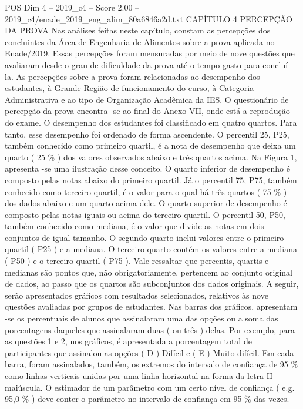 \begin{textsample}{POS Dim 4 – 2019\_c4 – Score 2.00 – 2019\_c4/enade\_2019\_eng\_alim\_80a6846a2d.txt}  \label{ex:f4_pos_112}
CAPÍTULO 4 PERCEPÇÃO DA PROVA Nas análises feitas neste capítulo, constam as percepções dos concluintes da Área de Engenharia de Alimentos sobre a prova aplicada no Enade/2019.
Essas percepções foram mensuradas por meio de nove questões que avaliaram desde o grau de dificuldade da prova até o tempo gasto para concluí -la.
As percepções sobre a prova foram relacionadas ao desempenho dos estudantes, à Grande Região de funcionamento do curso, à Categoria Administrativa e ao tipo de Organização Acadêmica da IES.
O questionário de percepção da prova encontra -se ao final do Anexo VII, onde está a reprodução do exame.
O desempenho dos estudantes foi classificado em quatro quartos.
Para tanto, esse desempenho foi ordenado de forma ascendente.
O percentil 25, P25, também conhecido como primeiro quartil, é a nota de desempenho que deixa um quarto ( 25 \% ) dos valores observados abaixo e três quartos acima.
Na Figura 1, apresenta -se uma ilustração desse conceito.
O quarto inferior de desempenho é composto pelas notas abaixo do primeiro quartil.
Já o percentil 75, P75, também conhecido como terceiro quartil, é o valor para o qual há três quartos ( 75 \% ) dos dados abaixo e um quarto acima dele.
O quarto superior de desempenho é composto pelas notas iguais ou acima do terceiro quartil.
O percentil 50, P50, também conhecido como mediana, é o valor que divide as notas em dois conjuntos de igual tamanho.
O segundo quarto inclui valores entre o primeiro quartil ( P25 ) e a mediana.
O terceiro quarto contém os valores entre a mediana ( P50 ) e o terceiro quartil ( P75 ).
Vale ressaltar que percentis, quartis e medianas são pontos que, não obrigatoriamente, pertencem ao conjunto original de dados, ao passo que os quartos são subconjuntos dos dados originais.
A seguir, serão apresentados gráficos com resultados selecionados, relativos às nove questões avaliadas por grupos de estudantes.
Nas barras dos gráficos, apresentam -se os percentuais de alunos que assinalaram uma das opções ou a soma das porcentagens daqueles que assinalaram duas ( ou três ) delas.
Por exemplo, para as questões 1 e 2, nos gráficos, é apresentada a porcentagem total de participantes que assinalou as opções ( D ) Difícil e ( E ) Muito difícil.
Em cada barra, foram assinalados, também, os extremos do intervalo de confiança de 95 \% como linhas verticais unidas por uma linha horizontal na forma da letra H maiúscula.
O estimador de um parâmetro com um certo nível de confiança ( e.g. 95,0 \% ) deve conter o parâmetro no intervalo de confiança em 95 \% das vezes.

\end{textsample}
